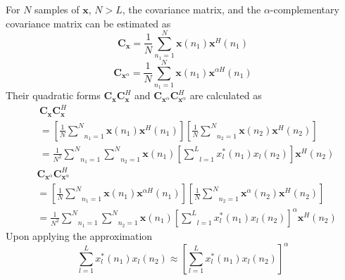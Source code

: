 \documentclass[review]{elsarticle}
\theoremstyle{plain}
\theoremstyle{remark}
\theoremstyle{plain}
\theoremstyle{definition}
\theoremstyle{prop}
\theoremstyle{definition}
\theoremstyle{plain}
\theoremstyle{plain}
\begin{document}
For $N$ samples of $\mathbf{x}$, $N>L$, the covariance matrix, and the $\alpha$-complementary covariance matrix can be estimated as 
\begin{equation}\label{covariance}
\mathbf{C}_{\mathbf{x}}=\frac{1}{N}\!\underset{n_1=1}{\overset{N}{\sum}}\mathbf{x}\left(n_1\right)\mathbf{x}^{H}\left(n_1\right)
\end{equation}
\begin{equation}\label{complementary covariance}
\mathbf{C}_{\mathbf{x}^\alpha}=\frac{1}{N}\!\underset{n_1=1}{\overset{N}{\sum}}\mathbf{x}\left(n_1\right)\mathbf{x}^{\alpha H}\left(n_1\right)
\end{equation}
Their quadratic forms $\mathbf{C}_{\mathbf{x}}\mathbf{C}_{\mathbf{x}}^H$ and $\mathbf{C}_{\mathbf{x}^\alpha}\mathbf{C}_{\mathbf{x}^\alpha}^H$ are calculated as
\small
\begin{align*}
&\mathbf{C}_{\mathbf{x}}\mathbf{C}_{\mathbf{x}}^{H} \\\!\!\!&\!\!=\!\!\left[\!\frac{1}{N}\!\underset{n_1=1}{\overset{N}{\sum}}\mathbf{x}\left(n_1\right)\mathbf{x}^{H}\left(n_1\right)\!\right]\!\!\left[\!\frac{1}{N}\!\underset{n_2=1}{\overset{N}{\sum}}\mathbf{x}\left(n_2\right)\mathbf{x}^{H}\left(n_2\right)\!\right]\\
\!\!&\!\!=\!\!\frac{1}{N^{2}}\underset{n_1=1}{\overset{N}{\sum}}\underset{n_2=1}{\overset{N}{\sum}}\mathbf{x}\left(n_1\right)\!\!\left[\underset{l=1}{\overset{L}{\sum}}x_{l}^{*}\left(n_1\right)x_{l}\left(n_2\right)\right]\!\!\mathbf{x}^{H}\left(n_2\right)
\end{align*}
\begin{align*}
&\mathbf{\mathbf{C}}_{\mathbf{x}^\alpha}\mathbf{C}_{\mathbf{x}^\alpha}^{H}\\
&\!\!=\!\!\left[\!\frac{1}{N}\!\!\underset{n_1=1}{\overset{N}{\sum}}\mathbf{x}\left(n_1\right)\mathbf{x}^{\alpha H}\left(n_1\right)\!\right]\!\!\left[\!\frac{1}{N}\!\!\underset{n_2=1}{\overset{N}{\sum}}\mathbf{x}^{\alpha}\left(n_2\right)\mathbf{x}^{H}\left(n_2\right)\!\right]\\
&\!\!=\!\!\frac{1}{N^{2}}\underset{n_1=1}{\overset{N}{\sum}}\underset{n_2=1}{\overset{N}{\sum}}\mathbf{x}\left(n_1\right)\!\!\left[\underset{l=1}{\overset{L}{\sum}}x_{l}^{*}\left(n_1\right)x_{l}\left(n_2\right)\right]^{\alpha}\!\!\!\!\mathbf{x}^{H}\left(n_2\right)
\end{align*}
\normalsize
Upon applying the approximation
\begin{equation}\label{single condition}
\underset{l=1}{\overset{L}{\sum}}x_{l}^{*}\left(n_1\right)x_{l}\left(n_2\right)
\!\!\approx\!\!\left[\underset{l=1}{\overset{L}{\sum}}x_{l}^{*}\left(n_1\right)x_{l}\left(n_2\right)\right]^{\alpha}
\end{equation}
\end{document}
